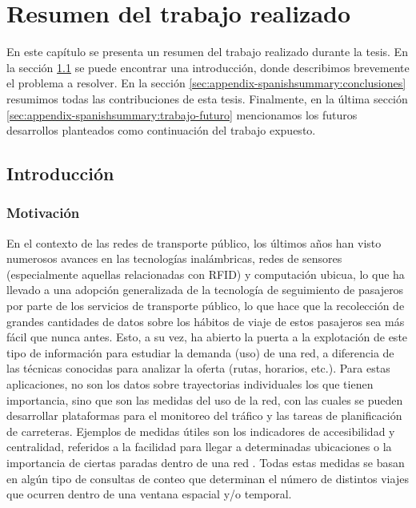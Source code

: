 \chapter{Resumen del trabajo realizado}
\label{ch:appendix-spanishsummary}

    En este cap\'itulo se presenta un resumen del trabajo realizado durante la tesis. En la secci\'on \ref{sec:appendix-spanishsummary:introduccion} se puede encontrar una introducci\'on, donde describimos brevemente el problema a resolver. En la secci\'on \ref{sec:appendix-spanishsummary:conclusiones} resumimos todas las contribuciones de esta tesis. Finalmente, en la \'ultima secci\'on \ref{sec:appendix-spanishsummary:trabajo-futuro} mencionamos los futuros desarrollos planteados como continuaci\'on del trabajo expuesto.

\section{Introducci\'on}
\label{sec:appendix-spanishsummary:introduccion}

\subsection{Motivaci\'on}

    En el contexto de las redes de transporte p\'ublico, los \'ultimos a\~nos han visto numerosos avances en las tecnolog\'ias inal\'ambricas, redes de sensores (especialmente aquellas relacionadas con RFID) y computaci\'on ubicua, lo que ha llevado a una adopci\'on generalizada de la tecnolog\'ia de seguimiento de pasajeros por parte de los servicios de transporte p\'ublico, lo que hace que la recolecci\'on de grandes cantidades de datos sobre los h\'abitos de viaje de estos pasajeros sea m\'as f\'acil que nunca antes.
    Esto, a su vez, ha abierto la puerta a la explotaci\'on de este tipo de informaci\'on para estudiar la demanda (uso) de una red, a diferencia de las t\'ecnicas conocidas para analizar la oferta (rutas, horarios, etc.).
    Para estas aplicaciones, no son los datos sobre trayectorias individuales los que tienen importancia, sino que son las medidas del uso de la red, con las cuales se pueden desarrollar plataformas para el monitoreo del tr\'afico y las tareas de planificaci\'on de carreteras. Ejemplos de medidas \'utiles son los indicadores de accesibilidad y centralidad, referidos a la facilidad para llegar a determinadas ubicaciones o la importancia de ciertas paradas dentro de una red \cite{Morency2007193, El-Geneidy2011, Wang2015335}. Todas estas medidas se basan en alg\'un tipo de consultas de conteo que determinan el n\'umero de distintos viajes que ocurren dentro de una ventana espacial y/o temporal.
    
